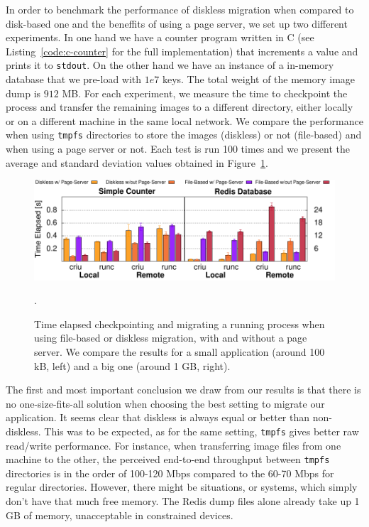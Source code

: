 In order to benchmark the performance of diskless migration when compared to disk-based one and the beneffits of using a page server, we set up two different experiments.
In one hand we have a counter program written in C (see Listing~\ref{code:c-counter} for the full implementation) that increments a value and prints it to \texttt{stdout}.
On the other hand we have an instance of a \redis in-memory database that we pre-load with $1e7$ keys.
The total weight of the memory image dump is $912$ MB.
For each experiment, we measure the time to checkpoint the process and transfer the remaining images to a different directory, either locally or on a different machine in the same local network.
We compare the performance when using \texttt{tmpfs} directories to store the images (diskless) or not (file-based) and when using a page server or not.
Each test is run 100 times and we present the average and standard deviation values obtained in Figure~\ref{fig:diskless-migration-microbenchmark}.

\begin{figure}[h!]
    \centering
    \includegraphics[width=.8\textwidth]{figs/diskless-migration-microbenchmark/diskless_migration_microbenchmark.pdf}
    \caption[Size of the memory image for iterative dumps.]{Time elapsed checkpointing and migrating a running process when using file-based or diskless migration, with and without a page server. We compare the results for a small application (around 100 kB, left) and a big one (around 1 GB, right).\label{fig:diskless-migration-microbenchmark}}.
\end{figure}

The first and most important conclusion we draw from our results is that there is no one-size-fits-all solution when choosing the best setting to migrate our application.
It seems clear that diskless is always equal or better than non-diskless.
This was to be expected, as for the same setting, \texttt{tmpfs} gives better raw read/write performance.
For instance, when transferring image files from one machine to the other, the perceived end-to-end throughput between \texttt{tmpfs} directories is in the order of 100-120 Mbps compared to the 60-70 Mbps for regular directories.
However, there might be situations, or systems, which simply don't have that much free memory.
The Redis dump files alone already take up 1 GB of memory, unacceptable in constrained devices.

